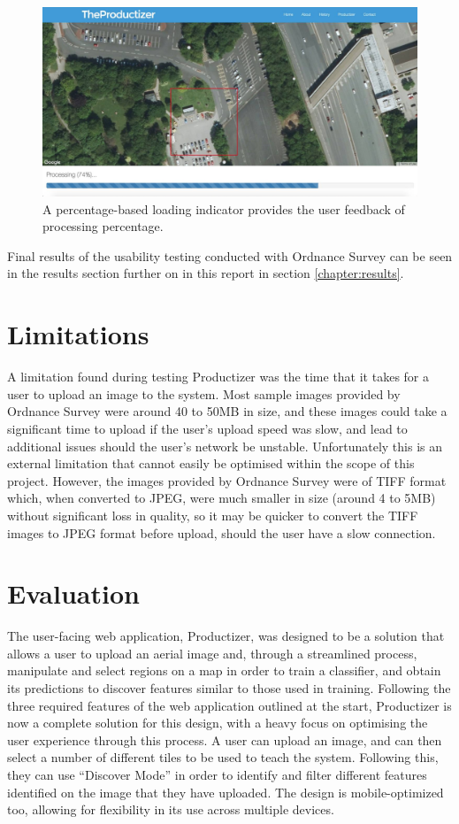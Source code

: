 \begin{figure}[H]
    \centering
    \includegraphics[width=\textwidth]{figs/6/6-usability-loading}
    \caption{A percentage-based loading indicator provides the user feedback of processing percentage.}
    \label{fig:prod:loading}
\end{figure}

Final results of the usability testing conducted with Ordnance Survey can be seen in the results section further on in this report in section \ref{chapter:results}.

\section{Limitations}

A limitation found during testing Productizer was the time that it takes for a user to upload an image to the system. Most sample images provided by Ordnance Survey were around 40 to 50MB in size, and these images could take a significant time to upload if the user’s upload speed was slow, and lead to additional issues should the user’s network be unstable. Unfortunately this is an external limitation that cannot easily be optimised within the scope of this project. However, the images provided by Ordnance Survey were of TIFF format which, when converted to JPEG, were much smaller in size (around 4 to 5MB) without significant loss in quality, so it may be quicker to convert the TIFF images to JPEG format before upload, should the user have a slow connection.

\section{Evaluation}

The user-facing web application, Productizer, was designed to be a solution that allows a user to upload an aerial image and, through a streamlined process, manipulate and select regions on a map in order to train a classifier, and obtain its predictions to discover features similar to those used in training. Following the three required features of the web application outlined at the start, Productizer is now a complete solution for this design, with a heavy focus on optimising the user experience through this process. A user can upload an image, and can then select a number of different tiles to be used to teach the system. Following this, they can use “Discover Mode” in order to identify and filter different features identified on the image that they have uploaded. The design is mobile-optimized too, allowing for flexibility in its use across multiple devices.